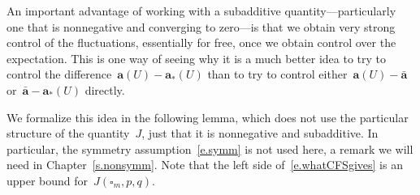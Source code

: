 \documentclass[11pt,twoside]{article} %
\let\oldsquare\square %
\renewcommand{\square}{\oldsquare}
\numberwithin{equation}{section}
\theoremstyle{definition}
\renewcommand{\a}{\mathbf{a}}
\newcommand{\ahom}{\bar{\a}}
\newcommand{\cu}{\square}
\begin{document}
An important advantage of working with a subadditive quantity---particularly one that is nonnegative and converging to zero---is that we obtain very strong control of the fluctuations, essentially for free, once we obtain control over the expectation. This is one way of seeing why it is a much better idea to try to control the difference~$\a(U) - \a_*(U)$ than to try to control either~$\a(U) - \ahom$ or~$\ahom - \a_*(U)$ directly.

\smallskip

We formalize this idea in the following lemma, which does not use the particular structure of the quantity~$J$, just that it is nonnegative and subadditive. In particular, the symmetry assumption~\eqref{e.symm} is not used here, a remark we will need in Chapter~\ref{s.nonsymm}. 
Note that the left side of~\eqref{e.whatCFSgives} is an upper bound for~$J(\cu_m,p,q)$.  
\end{document}
